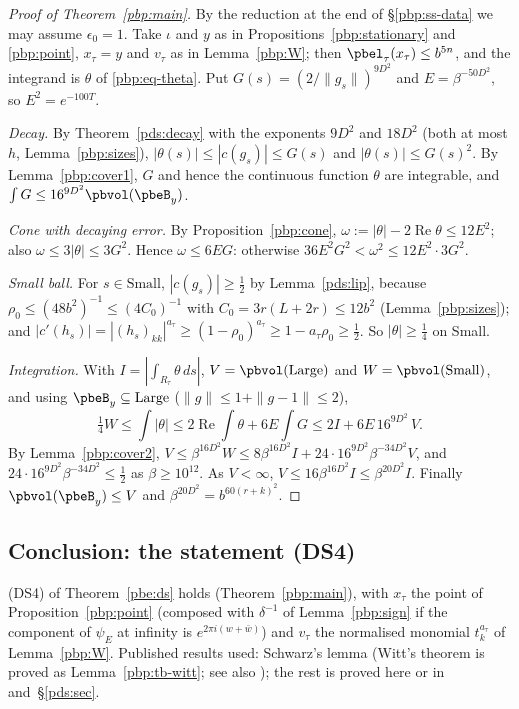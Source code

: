 \documentclass[10pt]{amsart}
\theoremstyle{definition}
\theoremstyle{remark}
\newcommand{\Rel}{\operatorname{Re}}
\begin{document}
\begin{proof}[Proof of Theorem~\ref{pbp:main}]
By the reduction at the end of \S\ref{pbp:ss-data} we may assume $\epsilon_0=1$. Take $\iota$ and $y$
as in Propositions~\ref{pbp:stationary} and \ref{pbp:point}, $x_\tau=y$ and $v_\tau$ as in
Lemma~\ref{pbp:W}; then $\pbel_\tau(x_\tau)\le b^{5n}$, and the integrand is $\theta$ of
\eqref{pbp:eq-theta}. Put $G(s)=(2/\|g_s\|)^{9D^2}$ and $E=\beta^{-50D^2}$, so $E^2=e^{-100T}$.

\emph{Decay.} By Theorem~\ref{pds:decay} with the exponents $9D^2$ and $18D^2$ (both at most $h$,
Lemma~\ref{pbp:sizes}), $|\theta(s)|\le|c(g_s)|\le G(s)$ and $|\theta(s)|\le G(s)^2$. By
Lemma~\ref{pbp:cover1}, $G$ and hence the continuous function $\theta$ are integrable, and $\int G\le
16^{9D^2}\pbvol(\pbeB_y)$.

\emph{Cone with decaying error.} By Proposition~\ref{pbp:cone}, $\omega:=|\theta|-2\Rel\theta\le12E^2$;
also $\omega\le3|\theta|\le3G^2$. Hence $\omega\le6EG$: otherwise $36E^2G^2<\omega^2\le12E^2\cdot3G^2$.

\emph{Small ball.} For $s\in\mathrm{Small}$, $|c(g_s)|\ge\frac12$ by Lemma~\ref{pds:lip}, because
$\rho_0\le(48b^2)^{-1}\le(4C_0)^{-1}$ with $C_0=3r(L+2r)\le12b^2$ (Lemma~\ref{pbp:sizes}); and
$|c'(h_s)|=|(h_s)_{kk}|^{a_\tau}\ge(1-\rho_0)^{a_\tau}\ge1-a_\tau\rho_0\ge\frac12$. So $|\theta|\ge\frac14$
on Small.

\emph{Integration.} With $I=|\int_{R_\tau}\theta\,ds|$, $V=\pbvol(\mathrm{Large})$ and $W=\pbvol(\mathrm{Small})$,
and using $\pbeB_y\subseteq\mathrm{Large}$ ($\|g\|\le1+\|g-1\|\le2$),
\[
\tfrac14W\le\int|\theta|\le2\Rel\int\theta+6E\int G\le2I+6E\,16^{9D^2}\,V .
\]
By Lemma~\ref{pbp:cover2}, $V\le\beta^{16D^2}W\le8\beta^{16D^2}I+24\cdot16^{9D^2}\beta^{-34D^2}V$, and
$24\cdot16^{9D^2}\beta^{-34D^2}\le\frac12$ as $\beta\ge10^{12}$. As $V<\infty$, $V\le16\beta^{16D^2}I\le
\beta^{20D^2}I$. Finally $\pbvol(\pbeB_y)\le V$ and $\beta^{20D^2}=b^{60(r+k)^2}$.
\end{proof}

\subsection{Conclusion: the statement (DS4)}\label{pbp:ss-summary}
\textup{(DS4)} of Theorem~\ref{pbe:ds} holds (Theorem~\ref{pbp:main}), with $x_\tau$ the point of
Proposition~\ref{pbp:point} (composed with $\delta^{-1}$ of Lemma~\ref{pbp:sign} if the component of
$\psi_E$ at infinity is $e^{2\pi i(w+\bar w)}$) and $v_\tau$ the normalised monomial $t_k^{a_\tau}$ of
Lemma~\ref{pbp:W}. Published results used: Schwarz's lemma (Witt's theorem is proved as Lemma~\ref{pbp:tb-witt}; see also \cite[Chapter~7, Theorem~9.1]{Scharlau});
the rest is proved here or in {\cite[\S3.2]{P49}} and~\S\ref{pds:sec}.
\end{document}
